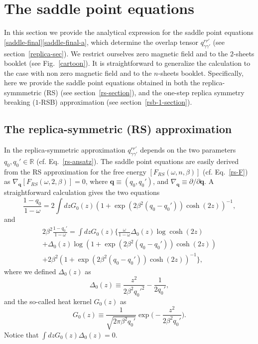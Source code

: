 \documentclass[twocolumn,superscriptaddress,prb,10pt]{revtex4-1}
\begin{document}
\appendix

\section{The saddle point equations} 
\label{saddle-equations}

In this section we provide the analytical expression for the saddle point equations 
\eqref{saddle-final}\eqref{saddle-final-a}, which determine the overlap tensor 
$q_{\gamma\gamma'}^{rr'}$ (see section~\ref{replica-sec}). We restrict ourselves 
zero magnetic field and to the $2$-sheets booklet (see Fig.~\ref{cartoon}). It is 
straightforward to generalize the calculation to the case with non zero magnetic 
field and to the $n$-sheets booklet. Specifically, here we provide the saddle point 
equations obtained in both the replica-symmmetric (RS) (see section~\ref{rs-section}), 
and the one-step replica symmetry breaking ($1$-RSB) approximation (see 
section~\ref{rsb-1-section}). 

\subsection{The replica-symmetric (RS) approximation}

In the replica-symmetric approximation $q_{\gamma\gamma'}^{rr'}$ depends on the two 
parameters $q_0,q_0'\in\mathbb{R}$ (cf. Eq.~\eqref{rs-ansatz}). The saddle point 
equations are easily derived from the RS approximation for the free energy $[F_{RS}
(\omega,n,\beta)]$ (cf. Eq.~\eqref{rs-F}) as $\nabla_{\mathbf{q}}[F_{RS}(\omega,2,
\beta)]=0$, where $\mathbf{q}\equiv(q_0,q_0')$, and $\nabla_{\mathbf{q}}\equiv
\partial/\partial\mathbf{q}$. A straightforward calculation gives the two equations 
%
\begin{equation}
\label{RS-saddle-1}
\frac{1-q_0}{1-\omega}=2\int dz G_0(z)(1+\exp(2\beta^2(q_0-q_0'))\cosh(2z))^{-1},
\end{equation}
%
and
%
\begin{multline}
\label{RS-saddle-2}
2\beta^2\frac{1-q_0'}{1-\omega}=
\int dz G_0(z)\Big\{\frac{\omega}{1-\omega}\Delta_0(z)
\log\cosh(2z)\\
+\Delta_0(z)\log(1+\exp(2\beta^2(q_0-q_0'))\cosh(2z))\\
+2\beta^2(1+\exp(2\beta^2(q_0-q_0'))\cosh(2z))^{-1}
\Big\},
\end{multline}
%
where we defined $\Delta_0(z)$ as 
%
\begin{equation}
\Delta_0(z)\equiv\frac{z^2}{2\beta^2q_0'^2}-\frac{1}{2q_0'},
\end{equation}
%
and the so-called heat kernel $G_0(z)$ as 
%
\begin{equation}
G_0(z)\equiv\frac{1}{\sqrt{2\pi \beta^2 q_0'}}\exp\Big(-\frac{z^2}
{2\beta^2 q_0'}\Big).
\end{equation}
%
Notice that $\int dz G_0(z)\Delta_0(z)=0$.
\end{document}

